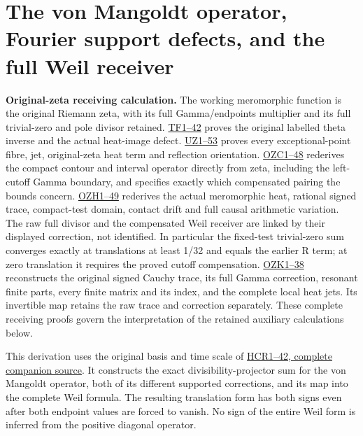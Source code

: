 \documentclass[
  10pt,
  a4paper,
]{article}
\author{}
\date{}
\begin{document}
{
\setcounter{tocdepth}{3}
\tableofcontents
}
\section{The von Mangoldt operator, Fourier support defects, and the
full Weil
receiver}\label{the-von-mangoldt-operator-fourier-support-defects-and-the-full-weil-receiver}

\textbf{Original-zeta receiving calculation.} The working meromorphic
function is the original Riemann zeta, with its full Gamma/endpoints
multiplier and its full trivial-zero and pole divisor retained.
\href{FAITHFUL_THETA_COMPLETION_RETURN.md}{TF1--42} proves the original
labelled theta inverse and the actual heat-image defect.
\href{FAITHFUL_UNCOMPLETED_ZETA_HEAT.md}{UZ1--53} proves every
exceptional-point fibre, jet, original-zeta heat term and reflection
orientation.
\href{ORIGINAL_ZETA_COMPACT_WEIL_RECONSTRUCTION.md}{OZC1--48} rederives
the compact contour and interval operator directly from zeta, including
the left-cutoff Gamma boundary, and specifies exactly which compensated
pairing the bounds concern.
\href{ORIGINAL_ZETA_HEAT_CONTACT_RECONSTRUCTION.md}{OZH1--49} rederives
the actual meromorphic heat, rational signed trace, compact-test domain,
contact drift and full causal arithmetic variation. The raw full divisor
and the compensated Weil receiver are linked by their displayed
correction, not identified. In particular the fixed-test trivial-zero
sum converges exactly at translations at least 1/32 and equals the
earlier R term; at zero translation it requires the proved cutoff
compensation. \href{ORIGINAL_ZETA_CAUCHY_RECONSTRUCTION.md}{OZK1--38}
reconstructs the original signed Cauchy trace, its full Gamma
correction, resonant finite parts, every finite matrix and its index,
and the complete local heat jets. Its invertible map retains the raw
trace and correction separately. These complete receiving proofs govern
the interpretation of the retained auxiliary calculations below.

This derivation uses the original basis and time scale of
\href{HURWITZ_CYCLOTOMIC_RECEIVER.tex}{HCR1--42, complete companion
source}. It constructs the exact divisibility-projector sum for the von
Mangoldt operator, both of its different supported corrections, and its
map into the complete Weil formula. The resulting translation form has
both signs even after both endpoint values are forced to vanish. No sign
of the entire Weil form is inferred from the positive diagonal operator.
\end{document}
